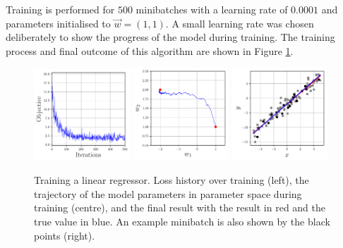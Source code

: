 Training is performed for $500$ minibatches with a learning rate of $0.0001$ and parameters initialised to $\vec{w}=(1,1)$. 
A small learning rate was chosen deliberately to show the progress of the model during training. 
The training process and final outcome of this algorithm are shown in Figure \ref{fig:machine_learning:lin_example}.
\begin{figure}[h!]
    \begin{center}
        \includegraphics[width=0.32\textwidth]{figures/machine_learning/loss_history.pdf}
        \includegraphics[width=0.32\textwidth]{figures/machine_learning/w1_w2_history.pdf}
        \includegraphics[width=0.32\textwidth]{figures/machine_learning/data_and_results.pdf}
    \end{center}
    \caption{Training a linear regressor. Loss history over training (left), the trajectory of the model parameters in parameter space during training (centre), and the final result with the result in red and the true value in blue. An example minibatch is also shown by the black points (right).}
        \label{fig:machine_learning:lin_example}
\end{figure}




